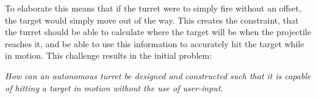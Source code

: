 To elaborate this means that if the turret were to simply fire without an
offset, the target would simply move out of the way. This creates the
constraint, that the turret should be able to calculate where the target will be
when the projectile reaches it, and be able to use this information to
accurately hit the target while in motion. This challenge results in the initial
problem:

\begin{center}
\begin{minipage}{0.8\linewidth}
\textit{How can an autonomous turret be designed and constructed such that it is
capable of hitting a target in motion without the use of user-input.}
\end{minipage}
\end{center}

